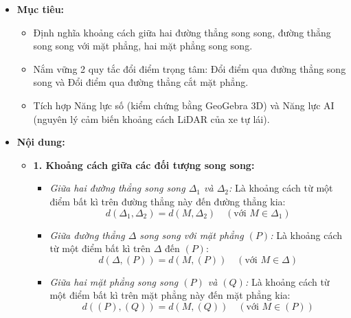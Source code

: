 \documentclass[12pt, a4paper]{article}
\begin{document}
\begin{itemize}[leftmargin=1.2cm]
    \item[a)] \textbf{Mục tiêu:}
    \begin{itemize}[leftmargin=0.6cm]
        \item Định nghĩa khoảng cách giữa hai đường thẳng song song, đường thẳng song song với mặt phẳng, hai mặt phẳng song song.
        \item Nắm vững 2 quy tắc đổi điểm trọng tâm: Đổi điểm qua đường thẳng song song và Đổi điểm qua đường thẳng cắt mặt phẳng.
        \item Tích hợp Năng lực số (kiểm chứng bằng GeoGebra 3D) và Năng lực AI (nguyên lý cảm biến khoảng cách LiDAR của xe tự lái).
    \end{itemize}

    \item[b)] \textbf{Nội dung:}
    \begin{itemize}[leftmargin=0.6cm]
        \item \textbf{1. Khoảng cách giữa các đối tượng song song:}
        \begin{itemize}
            \item \textit{Giữa hai đường thẳng song song $\Delta_1$ và $\Delta_2$:} Là khoảng cách từ một điểm bất kì trên đường thẳng này đến đường thẳng kia:
            $$d(\Delta_1, \Delta_2) = d(M, \Delta_2) \quad (\text{với } M \in \Delta_1)$$
            \item \textit{Giữa đường thẳng $\Delta$ song song với mặt phẳng $(P)$:} Là khoảng cách từ một điểm bất kì trên $\Delta$ đến $(P)$:
            $$d(\Delta, (P)) = d(M, (P)) \quad (\text{với } M \in \Delta)$$
            \item \textit{Giữa hai mặt phẳng song song $(P)$ và $(Q)$:} Là khoảng cách từ một điểm bất kì trên mặt phẳng này đến mặt phẳng kia:
            $$d((P), (Q)) = d(M, (Q)) \quad (\text{với } M \in (P))$$
        \end{itemize}


\end{itemize}
\end{itemize}
\end{document}
